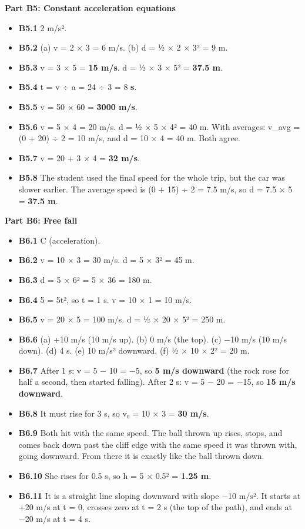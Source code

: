 \documentclass[
]{article}
\providecommand{\tightlist}{%
  \setlength{\itemsep}{0pt}\setlength{\parskip}{0pt}}
\begin{document}
\textbf{Part B5: Constant acceleration equations}

\begin{itemize}
\tightlist
\item
  \textbf{B5.1} 2 m/s².
\item
  \textbf{B5.2} (a) v = 2 × 3 = 6 m/s. (b) d = ½ × 2 × 3² = 9 m.
\item
  \textbf{B5.3} v = 3 × 5 = \textbf{15 m/s}. d = ½ × 3 × 5² =
  \textbf{37.5 m}.
\item
  \textbf{B5.4} t = v ÷ a = 24 ÷ 3 = 8 \textbf{s}.
\item
  \textbf{B5.5} v = 50 × 60 = \textbf{3000 m/s}.
\item
  \textbf{B5.6} v = 5 × 4 = 20 m/s. d = ½ × 5 × 4² = 40 m. With
  averages: v\_avg = (0 + 20) ÷ 2 = 10 m/s, and d = 10 × 4 = 40 m. Both
  agree.
\item
  \textbf{B5.7} v = 20 + 3 × 4 = \textbf{32 m/s}.
\item
  \textbf{B5.8} The student used the final speed for the whole trip, but
  the car was slower earlier. The average speed is (0 + 15) ÷ 2 = 7.5
  m/s, so d = 7.5 × 5 = \textbf{37.5 m}.
\end{itemize}

\textbf{Part B6: Free fall}

\begin{itemize}
\tightlist
\item
  \textbf{B6.1} C (acceleration).
\item
  \textbf{B6.2} v = 10 × 3 = 30 m/s. d = 5 × 3² = 45 m.
\item
  \textbf{B6.3} d = 5 × 6² = 5 × 36 = 180 m.
\item
  \textbf{B6.4} 5 = 5t², so t = 1 s. v = 10 × 1 = 10 m/s.
\item
  \textbf{B6.5} v = 20 × 5 = 100 m/s. d = ½ × 20 × 5² = 250 m.
\item
  \textbf{B6.6} (a) +10 m/s (10 m/s up). (b) 0 m/s (the top). (c) −10
  m/s (10 m/s down). (d) 4 s. (e) 10 m/s² downward. (f) ½ × 10 × 2² = 20
  m.
\item
  \textbf{B6.7} After 1 s: v = 5 − 10 = −5, so \textbf{5 m/s downward}
  (the rock rose for half a second, then started falling). After 2 s: v
  = 5 − 20 = −15, so \textbf{15 m/s downward}.
\item
  \textbf{B6.8} It must rise for 3 s, so v₀ = 10 × 3 = \textbf{30 m/s}.
\item
  \textbf{B6.9} Both hit with the same speed. The ball thrown up rises,
  stops, and comes back down past the cliff edge with the same speed it
  was thrown with, going downward. From there it is exactly like the
  ball thrown down.
\item
  \textbf{B6.10} She rises for 0.5 s, so h = 5 × 0.5² = \textbf{1.25 m}.
\item
  \textbf{B6.11} It is a straight line sloping downward with slope −10
  m/s². It starts at +20 m/s at t = 0, crosses zero at t = 2 s (the top
  of the path), and ends at −20 m/s at t = 4 s.
\end{itemize}
\end{document}

